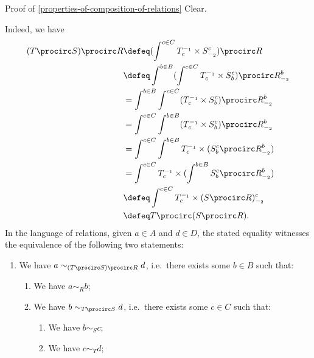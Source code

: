 \begin{Proof}{Proof of \cref{properties-of-composition-of-relations}}%
    Clear.

    Indeed, we have
    \begin{align*}
        (T\procirc S)\procirc R &\defeq (\int^{c\in C}T^{-_{1}}_{c}\times S^{c}_{-_{2}})\procirc R\\
                                &\defeq \int^{b\in B}(\int^{c\in C}T^{-_{1}}_{c}\times S^{c}_{b})\procirc R^{b}_{-_{2}}\\
                                &=      \int^{b\in B}\int^{c\in C}(T^{-_{1}}_{c}\times S^{c}_{b})\procirc R^{b}_{-_{2}}\\
                                &=      \int^{c\in C}\int^{b\in B}(T^{-_{1}}_{c}\times S^{c}_{b})\procirc R^{b}_{-_{2}}\\
                                &=      \int^{c\in C}\int^{b\in B}T^{-_{1}}_{c}\times(S^{c}_{b}\procirc R^{b}_{-_{2}})\\
                                &=      \int^{c\in C}T^{-_{1}}_{c}\times(\int^{b\in B}S^{c}_{b}\procirc R^{b}_{-_{2}})\\
                                &\defeq \int^{c\in C}T^{-_{1}}_{c}\times(S\procirc R)^{c}_{-_{2}}\\
                                &\defeq T\procirc(S\procirc R).
    \end{align*}
    In the language of relations, given $a\in A$ and $d\in D$, the stated equality witnesses the equivalence of the following two statements:
    \begin{enumerate}
        \item We have $a\sim_{(T\procirc S)\procirc R}d$, i.e.\ there exists some $b\in B$ such that:
            \begin{enumerate}
                \item We have $a\sim_{R}b$;
                \item We have $b\sim_{T\procirc S}d$, i.e.\ there exists some $c\in C$ such that:
                    \begin{enumerate}
                        \item We have $b\sim_{S}c$;
                        \item We have $c\sim_{T}d$;
                    \end{enumerate}

\end{enumerate}
\end{enumerate}
\end{Proof}
